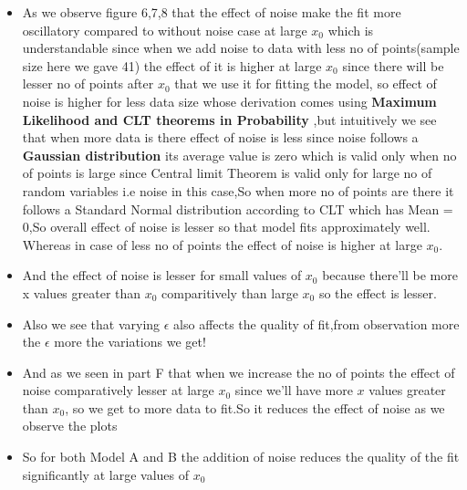 \documentclass[a4paper,10pt]{article}
\providecommand{\tightlist}{%
      \setlength{\itemsep}{0pt}\setlength{\parskip}{0pt}}
\begin{document}
\begin{itemize}
\tightlist
\item
  As we observe figure 6,7,8 that the effect of noise make the fit more
  oscillatory compared to without noise case at large \(x_0\) which is
  understandable since when we add noise to data with less no of
  points(sample size here we gave 41) the effect of it is higher at
  large \(x_0\) since there will be lesser no of points after \(x_0\)
  that we use it for fitting the model, so effect of noise is higher for
  less data size whose derivation comes using \textbf {Maximum Likelihood and CLT theorems in Probability}
  ,but intuitively we see that when more data is there effect of noise is less since noise follows a \textbf{Gaussian distribution} its average value is zero which is valid only when no of points is large since Central limit Theorem is valid only for large no of random variables i.e noise in this case,So when more no of points are there it follows a Standard Normal distribution according to CLT which has Mean = 0,So overall effect of noise is lesser so that model fits approximately well. Whereas in case of less no of points the effect of noise is higher at large \(x_0\).
  \item
  And the effect of noise is lesser for small values of \(x_0\) because
  there'll be more x values greater than \(x_0\) comparitively than
  large \(x_0\) so the effect is lesser.
\item
  Also we see that varying \(\epsilon\) also affects the quality of
  fit,from observation more the \(\epsilon\) more the variations we get!
\item
  And as we seen in part F that when we increase the no of points the
  effect of noise comparatively lesser at large \(x_0\) since we'll have
  more \(x\) values greater than \(x_0\), so we get to more data to
  fit.So it reduces the effect of noise as we observe the plots
\item
  So for both Model A and B the addition of noise reduces the quality of
  the fit significantly at large values of \(x_0\)
\end{itemize}


    
    
    
    
\end{document}
